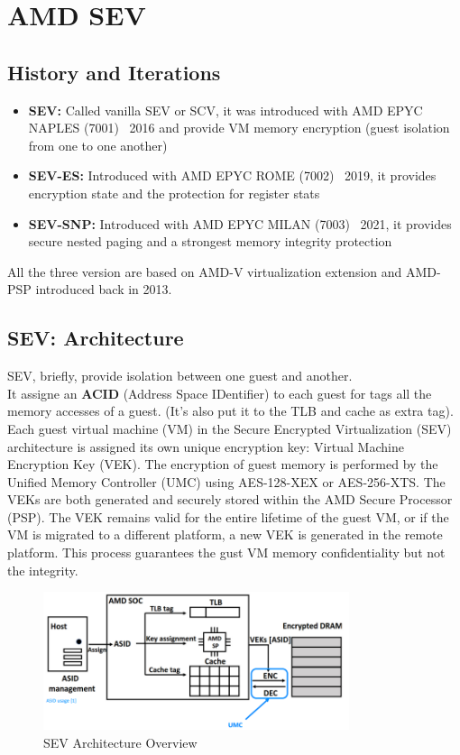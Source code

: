 \chapter{AMD SEV}

\section{History and Iterations}
\begin{itemize}
    \item \textbf{SEV:} Called vanilla SEV or SCV, it was introduced with AMD EPYC NAPLES (7001) ~2016 and provide VM memory encryption (guest isolation from one to one another)
    \item \textbf{SEV-ES:} Introduced with AMD EPYC ROME (7002) ~2019, it provides encryption state and the protection for register stats
    \item \textbf{SEV-SNP:} Introduced with AMD EPYC MILAN (7003) ~2021, it provides secure nested paging and a strongest memory integrity protection
\end{itemize}

All the three version are based on AMD-V virtualization extension and AMD-PSP introduced back in 2013.

\section{SEV: Architecture}

SEV, briefly, provide isolation between one guest and another. \\
It assigne an \textbf{ACID} (Address Space IDentifier) to each guest for tags all the memory accesses of a guest. (It's also put it to the TLB and cache as extra tag). \\
Each guest virtual machine (VM) in the Secure Encrypted Virtualization (SEV) architecture is assigned its own unique encryption key: Virtual Machine Encryption Key (VEK). 
The encryption of guest memory is performed by the Unified Memory Controller (UMC) using AES-128-XEX or AES-256-XTS. The VEKs are both generated and securely stored within the AMD Secure Processor (PSP). 
The VEK remains valid for the entire lifetime of the guest VM, or if the VM is migrated to a different platform, a new VEK is generated in the remote platform. This process guarantees the gust VM memory confidentiality but not the integrity.

\begin{figure}[h]
    \centering
    \includegraphics[width=0.8\textwidth]{img/sev-arch.png}
    \caption{SEV Architecture Overview}
    \label{fig:sev_architecture}
\end{figure}

